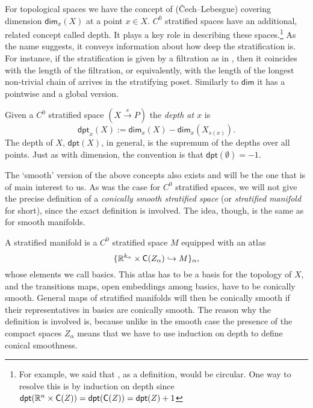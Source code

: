 \documentclass[../text]{subfiles}
\begin{document}
For topological spaces we have the concept of (\v{C}ech--Lebesgue) covering dimension $\mathsf{dim}_x (X)$ at a point $x \in X$. $C^0$ stratified spaces have an additional, related concept called depth. It plays a key role in describing these spaces.\footnote{For example, we said that , as a definition, would be circular. One way to resolve this is by induction on depth since $\mathsf{dpt} (\mathbb{R}^n \times \cone(Z)) = \mathsf{dpt} (\cone(Z)) = \mathsf{dpt} (Z) + 1$} As the name suggests, it conveys information about how deep the stratification is. For instance, if the stratification is given by a filtration as in , then it coincides with the length of the filtration, or equivalently, with the length of the longest non-trivial chain of arrives in the stratifying poset. Similarly to $\mathsf{dim}$ it has a pointwise and a global version.

\begin{definition}
    Given a $C^0$ stratified space $(X \xrightarrow{s} P)$ the \emph{depth at $x$} is
    \begin{equation}
        \mathsf{dpt}_x (X) := \mathsf{dim}_x (X) - \mathsf{dim}_x (X_{s(x)}).
    \end{equation}
    The depth of $X$, $\mathsf{dpt} (X)$, in general, is the supremum of the depths over all points. Just as with dimension, the convention is that $\mathsf{dpt}(\emptyset) = -1$.
\end{definition}

The `smooth' version of the above concepts also exists and will be the one that is of main interest to us. As was the case for $C^0$ stratified spaces, we will not give the precise definition of a \emph{conically smooth stratified space} (or \emph{stratified manifold} for short), since the exact definition is involved. The idea, though, is the same as for smooth manifolds.

A stratified manifold is a $C^0$ stratified space $M$ equipped with an atlas
%
\begin{equation}
    \{\mathbb{R}^{k_\alpha} \times \cone(Z_\alpha) \hookrightarrow M\}_\alpha,
\end{equation}
%
whose elements we call basics. This atlas has to be a basis for the topology of $X$, and the transitions maps, open embeddings among basics, have to be conically smooth. General maps of stratified manifolds will then be conically smooth if their representatives in basics are conically smooth.
The reason why the definition is involved is, because unlike in the smooth case the presence of the compact spaces $Z_\alpha$ means that we have to use induction on depth to define conical smoothness.
\end{document}
